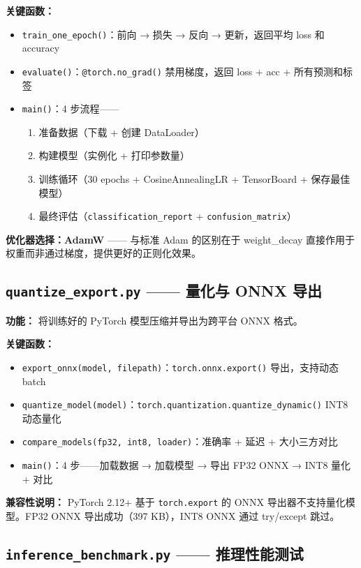 \documentclass[12pt,a4paper]{ctexart}
\newcommand{\file}[1]{\texttt{#1}}
\newcommand{\code}[1]{\texttt{#1}}
\begin{document}
\textbf{关键函数：}
\begin{itemize}
    \item \code{train\_one\_epoch()}：前向 → 损失 → 反向 → 更新，返回平均 loss 和 accuracy
    \item \code{evaluate()}：\code{@torch.no\_grad()} 禁用梯度，返回 loss + acc + 所有预测和标签
    \item \code{main()}：4 步流程——
    \begin{enumerate}
        \item 准备数据（下载 + 创建 DataLoader）
        \item 构建模型（实例化 + 打印参数量）
        \item 训练循环（30 epochs + CosineAnnealingLR + TensorBoard + 保存最佳模型）
        \item 最终评估（\code{classification\_report} + \code{confusion\_matrix}）
    \end{enumerate}
\end{itemize}

\textbf{优化器选择：AdamW} —— 与标准 Adam 的区别在于 weight\_decay 直接作用于权重而非通过梯度，提供更好的正则化效果。

\subsection{\file{quantize\_export.py} —— 量化与 ONNX 导出}

\textbf{功能：} 将训练好的 PyTorch 模型压缩并导出为跨平台 ONNX 格式。

\textbf{关键函数：}
\begin{itemize}
    \item \code{export\_onnx(model, filepath)}：\code{torch.onnx.export()} 导出，支持动态 batch
    \item \code{quantize\_model(model)}：\code{torch.quantization.quantize\_dynamic()} INT8 动态量化
    \item \code{compare\_models(fp32, int8, loader)}：准确率 + 延迟 + 大小三方对比
    \item \code{main()}：4 步——加载数据 → 加载模型 → 导出 FP32 ONNX → INT8 量化 + 对比
\end{itemize}

\textbf{兼容性说明：} PyTorch 2.12+ 基于 \code{torch.export} 的 ONNX 导出器不支持量化模型。FP32 ONNX 导出成功（397 KB），INT8 ONNX 通过 try/except 跳过。

\subsection{\file{inference\_benchmark.py} —— 推理性能测试}
\end{document}
